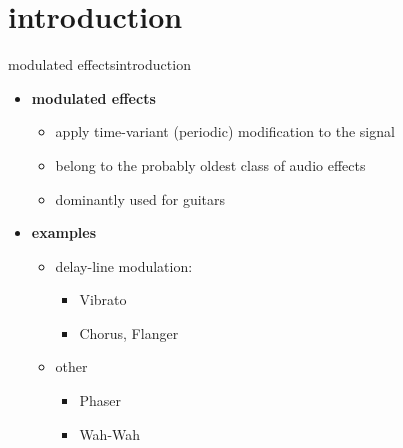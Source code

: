 


\subtitle{Part 19: Modulated Effects}


	

    \section[intro]{introduction}
        \begin{frame}{modulated effects}{introduction}
			
			\begin{itemize}
                \item   \textbf{modulated effects }
                    \begin{itemize}
                        \item   apply time-variant (periodic) modification to the signal
                        \item   belong to the probably oldest class of audio effects
                        \item   dominantly used for guitars
                    \end{itemize}
                \bigskip
				\item<2->	\textbf{examples}
					\begin{itemize}
						\item	delay-line modulation:
                            \begin{itemize}
                                \item Vibrato
                                \item   Chorus, Flanger
                            \end{itemize}
                        \item   other
                            \begin{itemize}
                                \item Phaser
                                \item   Wah-Wah
                            \end{itemize}
					\end{itemize}
			\end{itemize}
		\end{frame}

